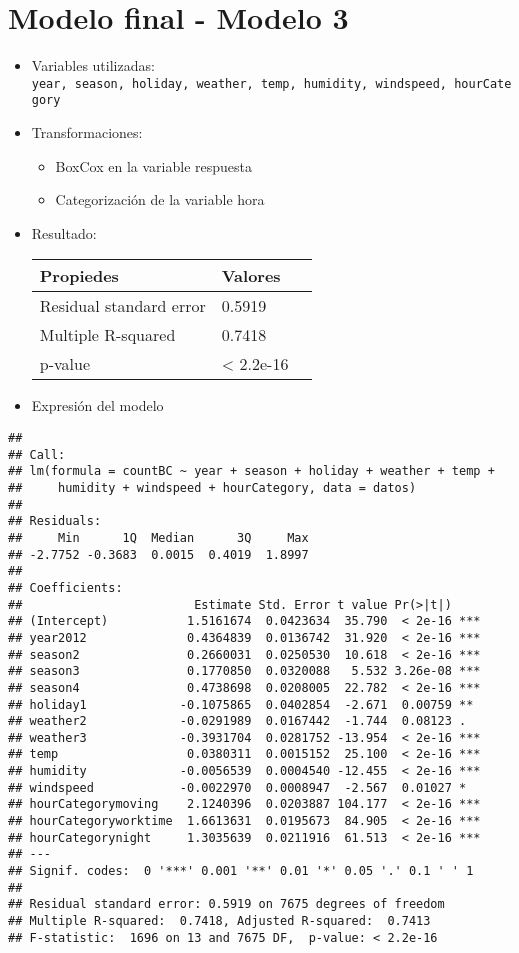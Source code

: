 \documentclass[
]{article}
\providecommand{\tightlist}{%
  \setlength{\itemsep}{0pt}\setlength{\parskip}{0pt}}
\begin{document}
\hypertarget{modelo-final---modelo-3}{%
\section{Modelo final - Modelo 3}\label{modelo-final---modelo-3}}

\begin{itemize}
\item
  Variables utilizadas:
  \texttt{year,\ season,\ holiday,\ weather,\ temp,\ humidity,\ windspeed,\ hourCategory}
\item
  Transformaciones:

  \begin{itemize}
  \tightlist
  \item
    BoxCox en la variable respuesta
  \item
    Categorización de la variable hora
  \end{itemize}
\item
  Resultado:

  \begin{longtable}[]{@{}lll@{}}
  \toprule
  Propiedes & Valores &\tabularnewline
  \midrule
  \endhead
  Residual standard error & 0.5919 &\tabularnewline
  Multiple R-squared & 0.7418 &\tabularnewline
  p-value & \textless{} 2.2e-16 &\tabularnewline
  \bottomrule
  \end{longtable}
\item
  Expresión del modelo
\end{itemize}

\begin{verbatim}
## 
## Call:
## lm(formula = countBC ~ year + season + holiday + weather + temp + 
##     humidity + windspeed + hourCategory, data = datos)
## 
## Residuals:
##     Min      1Q  Median      3Q     Max 
## -2.7752 -0.3683  0.0015  0.4019  1.8997 
## 
## Coefficients:
##                        Estimate Std. Error t value Pr(>|t|)    
## (Intercept)           1.5161674  0.0423634  35.790  < 2e-16 ***
## year2012              0.4364839  0.0136742  31.920  < 2e-16 ***
## season2               0.2660031  0.0250530  10.618  < 2e-16 ***
## season3               0.1770850  0.0320088   5.532 3.26e-08 ***
## season4               0.4738698  0.0208005  22.782  < 2e-16 ***
## holiday1             -0.1075865  0.0402854  -2.671  0.00759 ** 
## weather2             -0.0291989  0.0167442  -1.744  0.08123 .  
## weather3             -0.3931704  0.0281752 -13.954  < 2e-16 ***
## temp                  0.0380311  0.0015152  25.100  < 2e-16 ***
## humidity             -0.0056539  0.0004540 -12.455  < 2e-16 ***
## windspeed            -0.0022970  0.0008947  -2.567  0.01027 *  
## hourCategorymoving    2.1240396  0.0203887 104.177  < 2e-16 ***
## hourCategoryworktime  1.6613631  0.0195673  84.905  < 2e-16 ***
## hourCategorynight     1.3035639  0.0211916  61.513  < 2e-16 ***
## ---
## Signif. codes:  0 '***' 0.001 '**' 0.01 '*' 0.05 '.' 0.1 ' ' 1
## 
## Residual standard error: 0.5919 on 7675 degrees of freedom
## Multiple R-squared:  0.7418, Adjusted R-squared:  0.7413 
## F-statistic:  1696 on 13 and 7675 DF,  p-value: < 2.2e-16
\end{verbatim}
\end{document}
